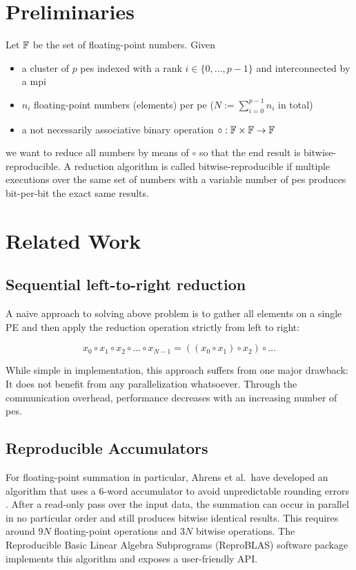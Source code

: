 \section{Preliminaries}
\label{sec:Preliminaries}
Let $\mathbb{F}$ be the set of floating-point numbers. Given
\begin{itemize}
\item a cluster of $p$ \glspl{pe} indexed with a rank $i \in \{0, \ldots, p - 1\}$ and interconnected by a \gls{mpi}
\item $n_i$ floating-point numbers (elements) per \gls{pe} ($N := \sum_{i=0}^{p-1} n_i$ in total)
\item a not necessarily associative binary operation $\circ: \mathbb{F} \times \mathbb{F} \rightarrow \mathbb{F}$
\end{itemize}
we want to reduce all numbers by means of $\circ$ so that the end result is bitwise-reproducible.
A reduction algorithm is called bitwise-reproducible if multiple executions over the same set of numbers with a variable
number of \glspl{pe} produces bit-per-bit the exact same results.


\section{Related Work}
\label{sec:RelatedWork}

\subsection{Sequential left-to-right reduction}
\label{sec:SequentialLeftToRightReduction}


A naive approach to solving above problem is to gather all elements on a single PE and then apply the reduction operation strictly from left to right:

\begin{equation}
x_0 \circ x_1 \circ x_2 \circ \ldots  \circ x_{N-1} = ((x_0 \circ x_1) \circ x_2) \circ \ldots
\end{equation}

While simple in implementation, this approach suffers from one major drawback:
It does not benefit from any parallelization whatsoever.
Through the communication overhead, performance decreases with an increasing number of \glspl{pe}.


\subsection{Reproducible Accumulators}
\label{sec:Reproducible Accumulators}
For floating-point summation in particular, Ahrens et al.\ have developed an algorithm that uses a 6-word accumulator
to avoid unpredictable rounding errors \cite{ahrens_algorithms_2020}. After a read-only pass over the input data,
the summation can occur in parallel in no particular order and still produces bitwise identical results.
This requires around $9N$ floating-point operations and $3N$ bitwise operations.
The Reproducible Basic Linear Algebra Subprograms (ReproBLAS) software package implements this algorithm and
exposes a user-friendly API.\@

